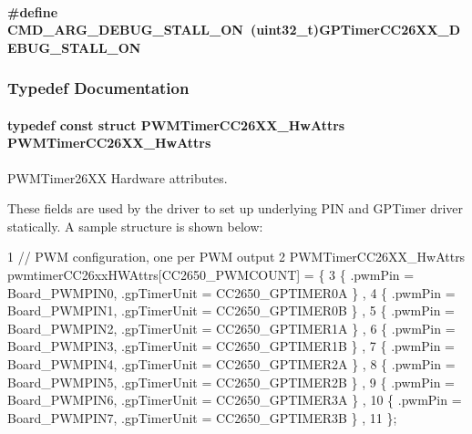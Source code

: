 \paragraph[{C\+M\+D\+\_\+\+A\+R\+G\+\_\+\+D\+E\+B\+U\+G\+\_\+\+S\+T\+A\+L\+L\+\_\+\+O\+N}]{\setlength{\rightskip}{0pt plus 5cm}\#define C\+M\+D\+\_\+\+A\+R\+G\+\_\+\+D\+E\+B\+U\+G\+\_\+\+S\+T\+A\+L\+L\+\_\+\+O\+N~(uint32\+\_\+t){\bf G\+P\+Timer\+C\+C26\+X\+X\+\_\+\+D\+E\+B\+U\+G\+\_\+\+S\+T\+A\+L\+L\+\_\+\+O\+N}}\label{_p_w_m_timer_c_c26_x_x_8h_a922b8318640c67c3c20a4e991e9b486d}


\subsubsection{Typedef Documentation}
\paragraph[{P\+W\+M\+Timer\+C\+C26\+X\+X\+\_\+\+Hw\+Attrs}]{\setlength{\rightskip}{0pt plus 5cm}typedef const struct {\bf P\+W\+M\+Timer\+C\+C26\+X\+X\+\_\+\+Hw\+Attrs}  {\bf P\+W\+M\+Timer\+C\+C26\+X\+X\+\_\+\+Hw\+Attrs}}\label{_p_w_m_timer_c_c26_x_x_8h_aebb4ec3a260d16ddb9e441f4cd9fde6b}


P\+W\+M\+Timer26\+X\+X Hardware attributes. 

These fields are used by the driver to set up underlying P\+I\+N and G\+P\+Timer driver statically. A sample structure is shown below\+:


\begin{DoxyCode}
1 // PWM configuration, one per PWM output
2 PWMTimerCC26XX\_HwAttrs pwmtimerCC26xxHWAttrs[CC2650\_PWMCOUNT] = \{
3  \{ .pwmPin = Board\_PWMPIN0, .gpTimerUnit = CC2650\_GPTIMER0A \} ,
4  \{ .pwmPin = Board\_PWMPIN1, .gpTimerUnit = CC2650\_GPTIMER0B \} ,
5  \{ .pwmPin = Board\_PWMPIN2, .gpTimerUnit = CC2650\_GPTIMER1A \} ,
6  \{ .pwmPin = Board\_PWMPIN3, .gpTimerUnit = CC2650\_GPTIMER1B \} ,
7  \{ .pwmPin = Board\_PWMPIN4, .gpTimerUnit = CC2650\_GPTIMER2A \} ,
8  \{ .pwmPin = Board\_PWMPIN5, .gpTimerUnit = CC2650\_GPTIMER2B \} ,
9  \{ .pwmPin = Board\_PWMPIN6, .gpTimerUnit = CC2650\_GPTIMER3A \} ,
10  \{ .pwmPin = Board\_PWMPIN7, .gpTimerUnit = CC2650\_GPTIMER3B \} ,
11 \};
\end{DoxyCode}
